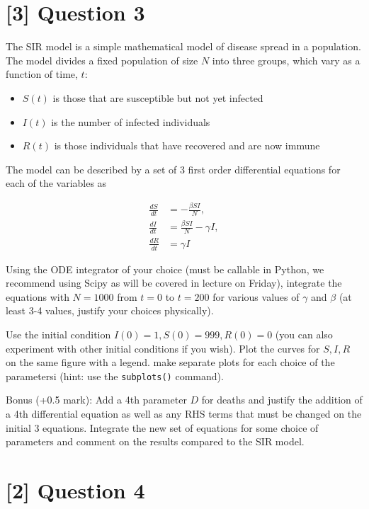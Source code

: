 \documentclass{article}
\begin{document}
\section*{[3] Question 3}

The SIR model is a simple mathematical model of disease spread in a population.
The model divides a fixed population of size $N$ into three groups, which vary as a function of time, $t$:

\begin{itemize}
    \item $S(t)$ is those that are susceptible but not yet infected
    \item $I(t)$ is the number of infected individuals
    \item $R(t)$ is those individuals that have recovered and are now immune
\end{itemize}

The model can be described by a set of 3 first order differential equations for each of the variables as

\begin{align}
    \frac{dS}{dt} &= -\frac{\beta S I}{N},\\
    \frac{dI}{dt} &= \frac{\beta S I}{N} - \gamma I,\\
    \frac{dR}{dt} &= \gamma I
\end{align}

Using the ODE integrator of your choice (must be callable in Python, we recommend using Scipy as will be covered in lecture on Friday), integrate the equations with $N=1000$ from $t=0$ to $t=200$ for various values of $\gamma$ and $\beta$ (at least 3-4 values, justify your choices physically).

Use the initial condition $I(0) = 1, S(0)=999, R(0) = 0$ (you can also experiment with other initial conditions if you wish).
Plot the curves for $S, I, R$ on the same figure with a legend. make separate plots for each choice of the parametersi (hint: use the \texttt{subplots()} command).

Bonus (+0.5 mark): Add a 4th parameter $D$ for deaths and justify the addition of a 4th differential equation as well as any RHS terms that must be changed on the initial 3 equations. Integrate the new set of equations for some choice of parameters and comment on the results compared to the SIR model.

\section*{[2] Question 4}
\end{document}
